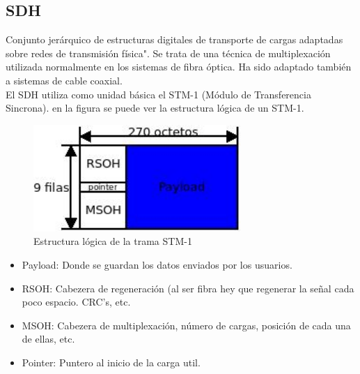 \subsection{\acrshort{SDH}}
Conjunto jerárquico de estructuras digitales de transporte de cargas adaptadas sobre redes de transmisión física". Se trata de una técnica de multiplexación utilizada normalmente en los sistemas de fibra óptica. Ha sido adaptado también a sistemas de cable coaxial.\\
El \acrshort{SDH} utiliza como unidad básica el \acrshort{STM}-1 (Módulo de Transferencia Sincrona). en la figura se puede ver la estructura lógica de un \acrshort{STM}-1.
\begin{figure}[H]
\centering
\includegraphics[width=0.7\textwidth]{Imagen/diaSTM1.jpg}
\caption{Estructura lógica de la trama STM-1}
\end{figure}
\begin{itemize}
	\item Payload: Donde se guardan los datos enviados por los usuarios.
	\item RSOH: Cabezera de regeneración (al ser fibra hey que regenerar la señal cada poco espacio. CRC's, etc.
	\item MSOH: Cabezera de multiplexación, número de cargas, posición de cada una de ellas, etc.
	\item Pointer: Puntero al inicio de la carga util.
\end{itemize}
